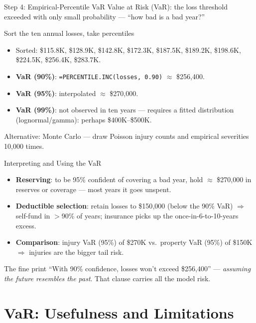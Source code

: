 \documentclass[11pt, aspectratio=169]{beamer}
\begin{document}
\begin{frame}{Step 4: Empirical-Percentile VaR}
\alert{Value at Risk (VaR)}: the loss threshold exceeded with only small probability --- ``how bad is a bad year?''
\begin{exampleblock}{Sort the ten annual losses, take percentiles}
\begin{itemize}
  \item Sorted: \$115.8K, \$128.9K, \$142.8K, \$172.3K, \$187.5K, \$189.2K, \$198.6K, \$224.5K, \$256.4K, \$283.7K.
  \item \textbf{VaR (90\%)}: \texttt{=PERCENTILE.INC(losses, 0.90)} $\approx$ \alert{\$256{,}400}.
  \item \textbf{VaR (95\%)}: interpolated $\approx$ \$270{,}000.
  \item \textbf{VaR (99\%)}: not observed in ten years --- requires a fitted distribution (lognormal/gamma): perhaps \$400K--\$500K.
\end{itemize}
\end{exampleblock}
Alternative: Monte Carlo --- draw Poisson injury counts and empirical severities 10{,}000 times.
\end{frame}

\begin{frame}{Interpreting and Using the VaR}
\begin{itemize}
  \item \textbf{Reserving}: to be 95\% confident of covering a bad year, hold $\approx$ \$270{,}000 in reserves or coverage --- most years it goes unspent.
  \item \textbf{Deductible selection}: retain losses to \$150{,}000 (below the 90\% VaR) $\Rightarrow$ self-fund in $>$90\% of years; insurance picks up the once-in-6-to-10-years excess.
  \item \textbf{Comparison}: injury VaR (95\%) of \$270K vs.\ property VaR (95\%) of \$150K $\Rightarrow$ injuries are the bigger tail risk.
\end{itemize}
\medskip
\begin{block}{The fine print}
``With 90\% confidence, losses won't exceed \$256{,}400'' --- \emph{assuming the future resembles the past}. That clause carries all the model risk.
\end{block}
\end{frame}

\section{VaR: Usefulness and Limitations}
\end{document}
